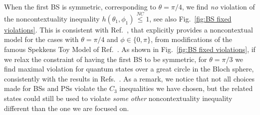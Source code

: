 \documentclass[a4paper,twocolumn,11pt,accepted=2024-01-17]{quantumarticle}
\begin{document}
When the first BS is symmetric, corresponding to $\theta=\pi/4$, we find \textit{no} violation of the noncontextuality inequality $h(\theta_1,\phi_1) \stackrel{NC}{\leq} 1$, see also Fig.~\ref{fig:BS fixed violations}. This is consistent with Ref.~\cite{catani2021interference}, that explicitly provides a noncontextual model for the cases with $\theta = \pi/4$ and $\phi \in \{0,\pi\}$, from modifications of the famous Spekkens Toy Model of Ref.~\cite{spekkens2007evidence}. As shown in Fig.~\ref{fig:BS fixed violations}, if we relax the constraint of having the first BS to be symmetric, for $\theta=\pi/3$ we find maximal violation for quantum states over a great circle in the Bloch sphere, consistently with the results in Refs.~\cite{galvaobroad2020quantumandclassical,giordani2021witnessesofcoherence}. As a remark, we notice that not all choices made for BSs and PSs violate the $C_3$ inequalities we have chosen, but the related states could still be used to violate \textit{some other} noncontextuality inequality different than the one we are focused {on.} 
\end{document}
